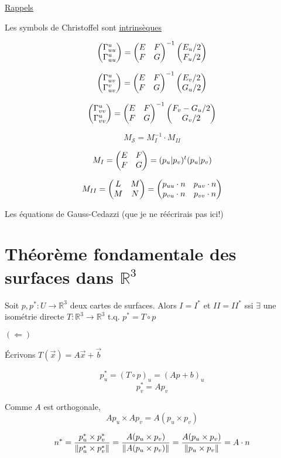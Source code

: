 



\underline{Rappels} 

Les symbols de Christoffel sont \underline{intrinsèques}

$$\begin{pmatrix} \Gamma_{uu}^{u}\\ \Gamma_{uu}^u \end{pmatrix}= \begin{pmatrix} E & F\\ F &G \end{pmatrix}^{-1}\begin{pmatrix} E_u/2\\F_u/2 \end{pmatrix}$$

$$\begin{pmatrix} \Gamma_{uv}^u\\ \Gamma_{uv}^v \end{pmatrix} = \begin{pmatrix} E & F\\ F & G \end{pmatrix}^{-1}\begin{pmatrix} E_{v}/2\\ G_{u} /2 \end{pmatrix}$$ 

$$\begin{pmatrix} \Gamma_{vv}^u\\ \Gamma_{vv}^u \end{pmatrix}=\begin{pmatrix} E &F\\F&G \end{pmatrix}^{-1}\begin{pmatrix} F_v-G_u/2\\G_v/2 \end{pmatrix}$$ 


$$M_{\mathcal{S}} = M_I^{-1} \cdot M_{II} $$ 

$$M_{I} = \begin{pmatrix} E&F\\F&G \end{pmatrix} = (p_u|p_v)^t(p_u|p_v)$$ 

$$M_{II} = \begin{pmatrix} L & M\\M&N \end{pmatrix} = \begin{pmatrix} p_{uu} \cdot n & p_{uv} \cdot n \\ p_{vu} \cdot n & p_{vv} \cdot n \end{pmatrix}$$ 


Les équations de Gauss-Cedazzi (que je ne réécrirais pas ici!)


\section*{Théorème fondamentale des surfaces dans $\mathbb{R}^{3} $  }

Soit $p,p^*:U\to \mathbb{R}^{3}$ deux cartes de surfaces. Alors $I=I^*$ et $II=II^*$ ssi $\exists$ une isométrie directe $T: \mathbb{R}^{3} \to \mathbb{R}^{3}$ t.q. $p^* = T \circ p$   


$(\Longleftarrow)$ 


Écrivons $T(\vec x) =  A \vec{x} + \vec b$ 

$$p_{u}^* = (T\circ p)_u = (Ap + b)_u $$ 
$$p_{v}^* = Ap_{v} $$ 

Comme $A$ est orthogonale, $$Ap_{u} \times Ap_{v} = A(p_{u} \times p_{v} )$$   

$$n^* = \frac{p_{u}^* \times p_{v}^*}{\norm{p_{u}^* \times p_{v}^*}} = \frac{A(p_{u} \times p_{v} )}{\norm{A(p_{u} \times  p_v)}} = \frac{A(p_{u} \times  p_v)}{\norm{p_{u} \times  p_{v} }} = A \cdot n$$ 


